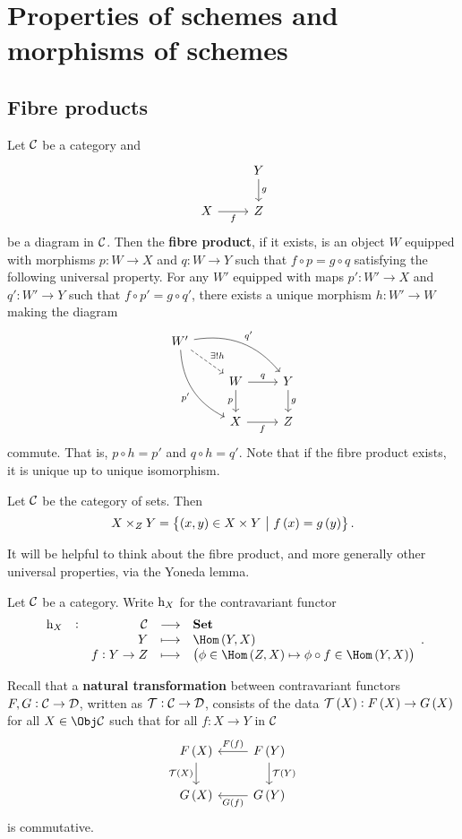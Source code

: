 \pagebreak

\section{Properties of schemes and morphisms of schemes}

\subsection{Fibre products}

Let $ \mathcal{C} $ be a category and
$$
\begin{tikzcd}
& Y \arrow{d}{g} \\
X \arrow{r}[swap]{f} & Z
\end{tikzcd}
$$
be a diagram in $ \mathcal{C} $. Then the \textbf{fibre product}, if it exists, is an object $ W $ equipped with morphisms $ p : W \to X $ and $ q : W \to Y $ such that $ f \circ p = g \circ q $ satisfying the following universal property. For any $ W' $ equipped with maps $ p' : W' \to X $ and $ q' : W' \to Y $ such that $ f \circ p' = g \circ q' $, there exists a unique morphism $ h : W' \to W $ making the diagram
$$
\begin{tikzcd}
W' \arrow[dashed]{dr}{\exists !h} \arrow[bend left=30]{drr}{q'} \arrow[bend right=30]{ddr}[swap]{p'} & & \\
& W \arrow{r}{q} \arrow{d}[swap]{p} & Y \arrow{d}{g} \\
& X \arrow{r}[swap]{f} & Z
\end{tikzcd}
$$
commute. That is, $ p \circ h = p' $ and $ q \circ h = q' $. Note that if the fibre product exists, it is unique up to unique isomorphism.

\begin{example*}
Let $ \mathcal{C} $ be the category of sets. Then
$$ X \times_Z Y = \cbr{\br{x, y} \in X \times Y \st f\br{x} = g\br{y}}. $$
\end{example*}

It will be helpful to think about the fibre product, and more generally other universal properties, via the Yoneda lemma.

\begin{definition*}
Let $ \mathcal{C} $ be a category. Write $ \mathrm{h}_X $ for the contravariant functor
$$ \functions[\h_X]{\CCC}{\Set}{Y}{\Hom\br{Y, X}}{f : Y \to Z}{\br{\phi \in \Hom\br{Z, X} \mapsto \phi \circ f \in \Hom\br{Y, X}}}. $$
\end{definition*}

Recall that a \textbf{natural transformation} between contravariant functors $ F, G : \mathcal{C} \to \mathcal{D} $, written as $ \mathcal{T} : \mathcal{C} \to \mathcal{D} $, consists of the data $ \TTT\br{X} : F\br{X} \to G\br{X} $ for all $ X \in \Obj \CCC $ such that for all $ f : X \to Y $ in $ \mathcal{C} $
$$
\begin{tikzcd}
F\br{X} \arrow{d}[swap]{\TTT\br{X}} & F\br{Y} \arrow{l}[swap]{F\br{f}} \arrow{d}{\TTT\br{Y}} \\
G\br{X} & G\br{Y} \arrow{l}{G\br{f}}
\end{tikzcd}
$$
is commutative.

